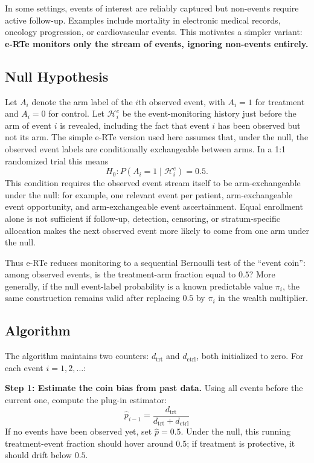 \documentclass[10pt]{article}
\begin{document}
In some settings, events of interest are reliably captured but non-events require active follow-up. Examples include mortality in electronic medical records, oncology progression, or cardiovascular events. This motivates a simpler variant: \textbf{e-RTe monitors only the stream of events, ignoring non-events entirely.}

\subsection{Null Hypothesis}

Let $A_i$ denote the arm label of the $i$th observed event, with $A_i=1$ for treatment and $A_i=0$ for control. Let $\mathcal{H}^e_i$ be the event-monitoring history just before the arm of event $i$ is revealed, including the fact that event $i$ has been observed but not its arm. The simple e-RTe version used here assumes that, under the null, the observed event labels are conditionally exchangeable between arms. In a 1:1 randomized trial this means
\begin{equation}
H_0: P(A_i=1 \mid \mathcal{H}^e_i) = 0.5 .
\end{equation}
This condition requires the observed event stream itself to be arm-exchangeable under the null: for example, one relevant event per patient, arm-exchangeable event opportunity, and arm-exchangeable event ascertainment. Equal enrollment alone is not sufficient if follow-up, detection, censoring, or stratum-specific allocation makes the next observed event more likely to come from one arm under the null.

Thus e-RTe reduces monitoring to a sequential Bernoulli test of the ``event coin'': among observed events, is the treatment-arm fraction equal to $0.5$? More generally, if the null event-label probability is a known predictable value $\pi_i$, the same construction remains valid after replacing $0.5$ by $\pi_i$ in the wealth multiplier.

\subsection{Algorithm}

The algorithm maintains two counters: $d_{\text{trt}}$ and $d_{\text{ctrl}}$, both initialized to zero. For each event $i = 1, 2, \ldots$:

\textbf{Step 1: Estimate the coin bias from past data.} Using all events before the current one, compute the plug-in estimator:
\begin{equation}
\hat{p}_{i-1} = \frac{d_{\text{trt}}}{d_{\text{trt}} + d_{\text{ctrl}}}
\end{equation}
If no events have been observed yet, set $\hat{p} = 0.5$. Under the null, this running treatment-event fraction should hover around $0.5$; if treatment is protective, it should drift below $0.5$.
\end{document}
